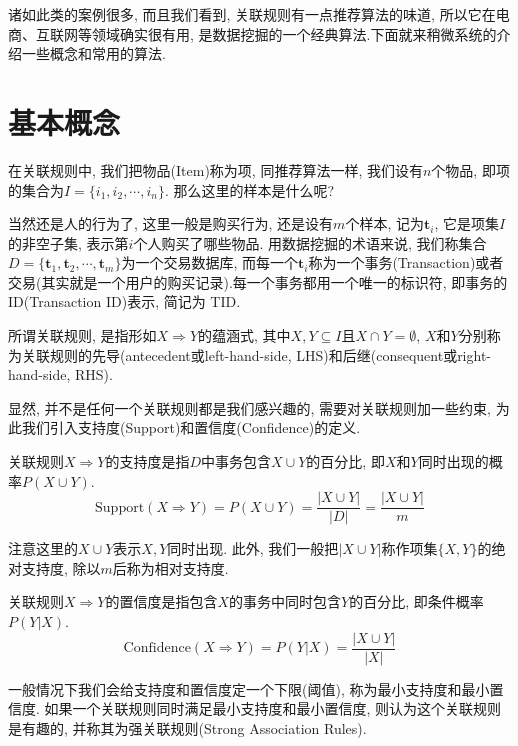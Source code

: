 \documentclass[a4paper,UTF8]{ctexart}
\theoremstyle{plain} \newtheorem{theorem}{定理}[section]
\theoremstyle{plain} \newtheorem{definition}{定义}[section]
\theoremstyle{plain} \newtheorem{lemma}{引理}[section]
\theoremstyle{plain} \newtheorem{proposition}{命题}[section]
\theoremstyle{plain} \newtheorem{example}{例}[section]
\theoremstyle{plain} \newtheorem{remark}{注}[section]
\theoremstyle{plain} \newtheorem{corollary}{推论}[section]
\begin{document}
诸如此类的案例很多, 而且我们看到, 关联规则有一点推荐算法的味道, 所以它在电商、互联网等领域确实很有用, 是数据挖掘的一个经典算法.下面就来稍微系统的介绍一些概念和常用的算法.


\section{基本概念}
在关联规则中, 我们把物品(Item)称为项, 同推荐算法一样, 我们设有$n$个物品, 即项的集合为$I = \{i_1,i_2,\cdots,i_n\}$. 那么这里的样本是什么呢?

当然还是人的行为了, 这里一般是购买行为, 还是设有$m$个样本, 记为$\bm{t}_{i}$, 它是项集$I$的非空子集, 表示第$i$个人购买了哪些物品. 用数据挖掘的术语来说, 我们称集合$D = \{\bm{t}_1,\bm{t}_2,\cdots,\bm{t}_m\}$为一个交易数据库, 而每一个$\bm{t}_i$称为一个事务(Transaction)或者交易(其实就是一个用户的购买记录).每一个事务都用一个唯一的标识符, 即事务的ID(Transaction ID)表示, 简记为 TID. 

所谓关联规则, 是指形如$X \Rightarrow Y$的蕴涵式, 其中$X,Y \subseteq I$且$X \cap Y = \emptyset$, $X$和$Y$分别称为关联规则的先导(antecedent或left-hand-side, LHS)和后继(consequent或right-hand-side, RHS).

显然, 并不是任何一个关联规则都是我们感兴趣的, 需要对关联规则加一些约束, 为此我们引入支持度(Support)和置信度(Confidence)的定义.

关联规则$X \Rightarrow Y$的支持度是指$D$中事务包含$X \cup Y$的百分比, 即$X$和$Y$同时出现的概率$P(X \cup Y)$.
\begin{equation*}
\mathrm{Support}(X \Rightarrow Y) = P(X \cup Y) = \frac{|X \cup Y|}{|D|} = \frac{|X \cup Y|}{m}
\end{equation*}

注意这里的$X \cup Y$表示$X, Y$同时出现. 此外, 我们一般把$|X \cup Y|$称作项集$\{X,Y\}$的绝对支持度, 除以$m$后称为相对支持度.

关联规则$X \Rightarrow Y$的置信度是指包含$X$的事务中同时包含$Y$的百分比, 即条件概率$P(Y | X)$.
\begin{equation*}
\mathrm{Confidence}(X \Rightarrow Y) = P(Y | X) = \frac{|X \cup Y|}{|X|}
\end{equation*}

一般情况下我们会给支持度和置信度定一个下限(阈值), 称为最小支持度和最小置信度. 如果一个关联规则同时满足最小支持度和最小置信度, 则认为这个关联规则是有趣的, 并称其为强关联规则(Strong Association Rules).
\end{document}

